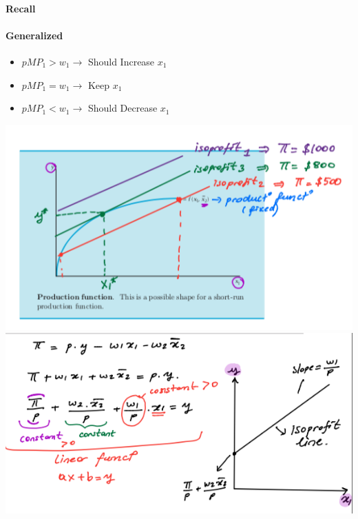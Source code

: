 \documentclass{report}
\begin{document}
\paragraph{Recall}

\paragraph{Generalized}
\begin{itemize}
\item $pMP_1>w_1\to$ Should Increase $x_1$
\item $pMP_1=w_1\to$ Keep $x_1$
\item $pMP_1<w_1\to$ Should Decrease $x_1$
\end{itemize}
\includegraphics[width = \textwidth]{econ10}
\includegraphics[width = \textwidth]{econ11}
\end{document}
